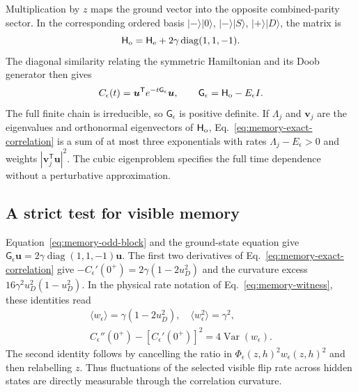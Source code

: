\documentclass[aps,pre,reprint,amsmath,amssymb,longbibliography,floatfix]{revtex4-2}
\begin{document}
Multiplication by $z$ maps the ground vector into the opposite
combined-parity sector. In the corresponding ordered basis
$|-\rangle|0\rangle$, $|-\rangle|S\rangle$, $|+\rangle|D\rangle$,
the matrix is
\begin{equation}
 \mathsf H_{\rm o}
 =\mathsf H_{\rm e}+2\gamma\operatorname{diag}(1,1,-1).
 \label{eq:memory-odd-block}
\end{equation}
The diagonal similarity relating the symmetric Hamiltonian and its
Doob generator then gives
\begin{equation}
 C_\epsilon(t)=\boldsymbol u^{\mathsf T}
 e^{-t\mathsf G_\epsilon}\boldsymbol u,
 \qquad
 \mathsf G_\epsilon=\mathsf H_{\rm o}-E_\epsilon I.
 \label{eq:memory-exact-correlation}
\end{equation}
The full finite chain is irreducible, so $\mathsf G_\epsilon$ is positive
definite. If $\Lambda_j$ and $\boldsymbol v_j$ are the eigenvalues and
orthonormal eigenvectors of $\mathsf H_{\rm o}$, Eq.~\eqref{eq:memory-exact-correlation}
is a sum of at most three exponentials with rates
$\Lambda_j-E_\epsilon>0$ and weights
$|\boldsymbol v_j^{\mathsf T}\boldsymbol u|^2$. The cubic eigenproblem
specifies the full time dependence without a perturbative approximation.

\subsection{A strict test for visible memory}

Equation~\eqref{eq:memory-odd-block} and the ground-state equation give
$\mathsf G_\epsilon\boldsymbol u=
2\gamma\operatorname{diag}(1,1,-1)\boldsymbol u$.
The first two derivatives of Eq.~\eqref{eq:memory-exact-correlation}
give $-C_\epsilon'(0^+)=2\gamma(1-2u_D^2)$ and the curvature excess
$16\gamma^2u_D^2(1-u_D^2)$. In the physical rate notation of
Eq.~\eqref{eq:memory-witness}, these identities read
\begin{equation}
 \begin{gathered}
 \langle w_\epsilon\rangle=\gamma(1-2u_D^2),\quad
 \langle w_\epsilon^2\rangle=\gamma^2,\\
 C_\epsilon''(0^+)-\left[C_\epsilon'(0^+)\right]^2
 =4\operatorname{Var}(w_\epsilon).
 \end{gathered}
 \label{eq:memory-rate-variance}
\end{equation}
The second identity follows by cancelling the ratio in
$\Phi_\epsilon(z,h)^2w_\epsilon(z,h)^2$ and then relabelling $z$.
Thus fluctuations of the selected visible flip rate across hidden
states are directly measurable through the correlation curvature.
\end{document}
